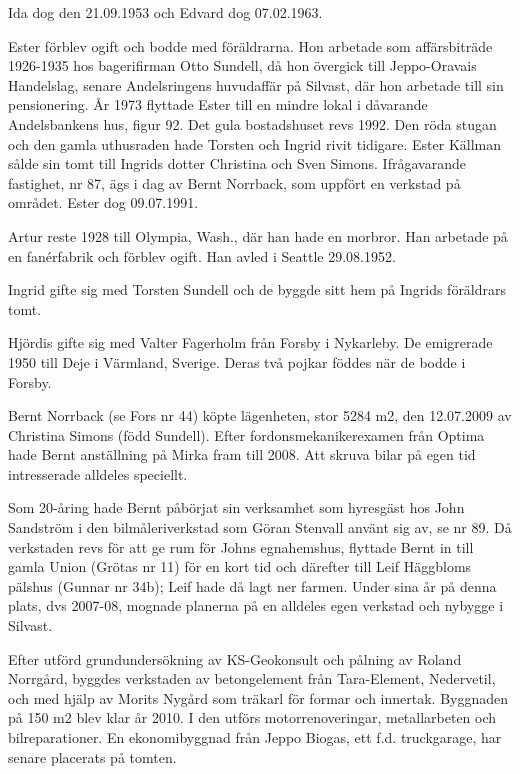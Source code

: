 Ida dog den 21.09.1953 och Edvard dog 07.02.1963.

Ester förblev ogift och bodde med föräldrarna. Hon arbetade som affärsbiträde 1926-1935 hos bagerifirman Otto Sundell, då hon övergick till Jeppo-Oravais Handelslag, senare Andelsringens huvudaffär på 	Silvast, där hon arbetade till sin pensionering. År 1973 flyttade Ester till 	en mindre lokal i dåvarande Andelsbankens hus, figur 92. Det gula bostadshuset revs 1992. Den röda stugan och den gamla uthusraden hade 	Torsten och Ingrid rivit tidigare. Ester Källman sålde sin tomt till Ingrids dotter Christina och Sven Simons. Ifrågavarande fastighet, nr 87, ägs i dag av Bernt Norrback, som uppfört en verkstad på området. Ester dog 09.07.1991.

Artur reste 1928 till Olympia, Wash., där han hade en morbror. Han 	arbetade på en fanérfabrik och förblev ogift. Han avled i Seattle 	29.08.1952.

Ingrid gifte sig med Torsten Sundell och de byggde sitt hem på Ingrids föräldrars tomt.

Hjördis gifte sig med Valter Fagerholm från Forsby i Nykarleby. De 	emigrerade 1950 till Deje i Värmland, Sverige. Deras två pojkar föddes 	när de bodde i Forsby.



Bernt Norrback (se Fors nr 44) köpte lägenheten, stor 5284 m2, den 12.07.2009  av Christina Simons (född Sundell). Efter fordonsmekanikerexamen från Optima hade Bernt anställning på Mirka fram till 2008. Att skruva bilar på egen tid intresserade alldeles speciellt.


Som 20-åring hade Bernt påbörjat sin verksamhet som hyresgäst	hos John Sandström i den bilmåleriverkstad som Göran Stenvall använt sig av, se nr 89. Då verkstaden revs för att ge rum för Johns egnahemshus, flyttade Bernt in till gamla Union (Grötas nr 11) för en kort tid och därefter till Leif Häggbloms pälshus (Gunnar nr 34b); Leif hade då lagt ner farmen. Under sina år på denna plats, dvs 2007-08, mognade	planerna på en alldeles egen verkstad och nybygge i Silvast.

Efter utförd grundundersökning av KS-Geokonsult och pålning av Roland Norrgård, byggdes verkstaden av betongelement från Tara-Element, Nedervetil, och med hjälp av Morits Nygård som träkarl för formar och innertak. Byggnaden på 150 m2 blev klar år 2010. I den utförs	motorrenoveringar, metallarbeten och bilreparationer. En ekonomibyggnad från Jeppo Biogas, ett f.d. truckgarage, har senare placerats på tomten.


